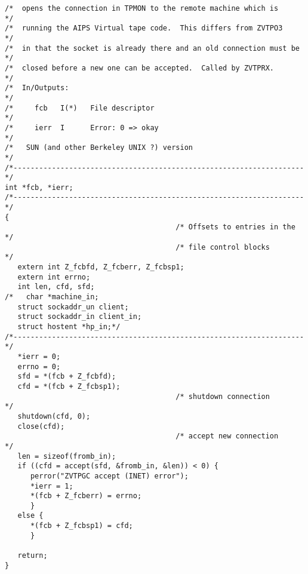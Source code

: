 \begin{center}
\begin{verbatim}
/*  opens the connection in TPMON to the remote machine which is      */
/*  running the AIPS Virtual tape code.  This differs from ZVTPO3     */
/*  in that the socket is already there and an old connection must be */
/*  closed before a new one can be accepted.  Called by ZVTPRX.       */
/*  In/Outputs:                                                       */
/*     fcb   I(*)   File descriptor                                   */
/*     ierr  I      Error: 0 => okay                                  */
/*   SUN (and other Berkeley UNIX ?) version                          */
/*--------------------------------------------------------------------*/
int *fcb, *ierr;
/*--------------------------------------------------------------------*/
{
                                        /* Offsets to entries in the  */
                                        /* file control blocks        */
   extern int Z_fcbfd, Z_fcberr, Z_fcbsp1;
   extern int errno;
   int len, cfd, sfd;
/*   char *machine_in;
   struct sockaddr_un client;
   struct sockaddr_in client_in;
   struct hostent *hp_in;*/
/*--------------------------------------------------------------------*/
   *ierr = 0;
   errno = 0;
   sfd = *(fcb + Z_fcbfd);
   cfd = *(fcb + Z_fcbsp1);
                                        /* shutdown connection        */
   shutdown(cfd, 0);
   close(cfd);
                                        /* accept new connection      */
   len = sizeof(fromb_in);
   if ((cfd = accept(sfd, &fromb_in, &len)) < 0) {
      perror("ZVTPGC accept (INET) error");
      *ierr = 1;
      *(fcb + Z_fcberr) = errno;
      }
   else {
      *(fcb + Z_fcbsp1) = cfd;
      }

   return;
}

\end{verbatim}
\end{center}



